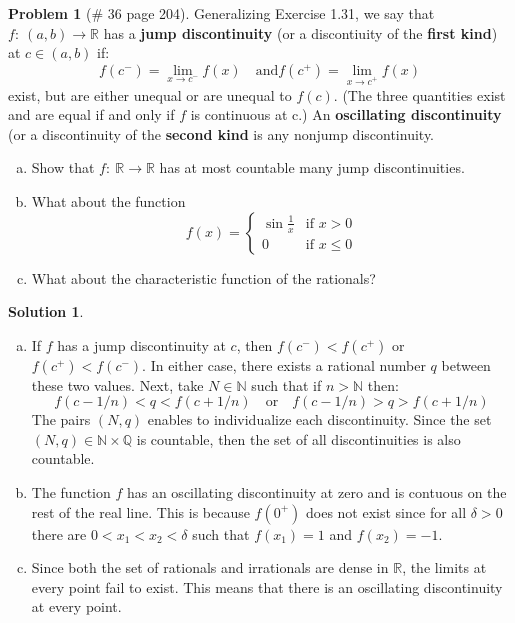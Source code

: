 \documentclass{article}
\theoremstyle{definition}
\newtheorem*{soln}{Solution}
\newtheorem*{prob}{Problem}
\theoremstyle{theorem}
\newcommand{\R}{\mathbb{R}}
\newcommand{\Q}{\mathbb{Q}}
\newcommand{\N}{\mathbb{N}}
\begin{document}
\begin{prob}[\# 36  page 204]
    Generalizing Exercise 1.31, we say that $f:\ (a,b) \to \R$ has a \textbf{jump discontinuity} (or a discontiuity of the \textbf{first kind}) at $c\in (a,b)$ if:
    $$f(c^-) = \lim_{x\to c^- }f(x) \quad \text{and} f(c^+) = \lim_{x\to c^+ }f(x)$$
    exist, but are either unequal or are unequal to $f(c)$. (The three quantities exist and are equal if and only if $f$ is continuous at c.) An \textbf{oscillating discontinuity } (or a discontinuity of the \textbf{second kind} is any nonjump discontinuity.
    \begin{enumerate}[(a)]
        \item Show that $f:\ \R \to \R$ has at most countable many jump discontinuities.
        \item What about the function
            $$f(x) = \begin{cases} \sin \frac 1x & \text{if } x>0 \\
            0 & \text{if } x\leq 0 \end{cases}$$
        \item What about the characteristic function of the rationals?
    \end{enumerate}
\end{prob}
\begin{soln}
    \begin{enumerate}[(a)]
        \item If $f$ has a jump discontinuity at $c$, then $f(c^-) < f(c^+)$ or $f(c^+) < f(c^-)$. In either case, there exists a rational number $q$ between these two values. Next, take $N\in \N$ such that if $n>\N$ then:
            $$f(c-1/n) < q < f(c+1/n) \quad \text{or} \quad f(c-1/n) > q > f(c+1/n)$$
            The pairs $(N,q)$ enables to individualize each discontinuity. Since the set $(N,q)\in \N\times \Q$ is countable, then the set of all discontinuities is also countable.
        \item The function $f$ has an oscillating discontinuity at zero and is contuous on the rest of the real line. This is because $f(0^+)$ does not exist since for all $\delta>0$ there are $0<x_1<x_2<\delta$ such that $f(x_1)=1$ and $f(x_2)=-1$.
        \item Since both the set of rationals and irrationals are dense in $\R$, the limits at every point fail to exist. This means that there is an oscillating discontinuity at every point. 
    \end{enumerate}
\end{soln}
\vspace{1in}
\end{document}
